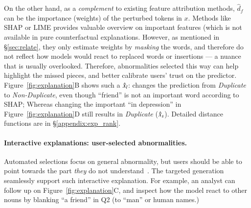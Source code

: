 On the other hand, as a \emph{complement} to existing feature attribution methods, $\hat{d}_f$ can be the importance (weights) of the perturbed tokens in $x$.
Methods like SHAP or LIME provides valuable overview on important features (which is not available in pure counterfactual explanations.
However, as mentioned in \S\ref{sec:relate}, they only estimate weights by \emph{masking} the words, and therefore do not reflect how models would react to replaced words or insertions --- a nuance that is usually overlooked.
Therefore, abnormalities selected this way can help highlight the missed pieces, and better calibrate users' trust on the predictor. 
Figure~\ref{fig:explanation}B shows such a $\hat{x}_l$:  changes the prediction from \emph{Duplicate} to \emph{Non-Duplicate}, even though ``friend'' is not an important word according to SHAP; Whereas changing the important ``in depression'' in Figure~\ref{fig:explanation}D still results in \emph{Duplicate} ($\hat{x}_s$).
Detailed distance functions are in \S\ref{appendix:exp_rank}.


\paragraph{Interactive explanations: user-selected abnormalities.}
Automated selections focus on general abnormality, but users should be able to point towards the part \emph{they} do not understand~\cite{miller}.
The targeted generation seamlessly support such interactive explanation.
For example, an analyst can follow up on Figure~\ref{fig:explanation}C, and inspect how the model react to other nouns by blanking ``a friend'' in Q2 (\eg to ``man'' or human names.)


